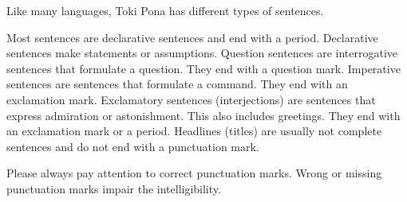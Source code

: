 Like many languages, Toki Pona has different types of sentences.

Most sentences are declarative sentences and end with a period.
Declarative sentences make statements or assumptions.
%
Question sentences are interrogative sentences that formulate a question.
They end with a question mark.
%
Imperative sentences are sentences that formulate a command.
They end with an exclamation mark.
%
Exclamatory sentences (interjections) are sentences that express admiration or astonishment.
This also includes greetings.
They end with an exclamation mark or a period.
%
Headlines (titles) are usually not complete sentences and do not end with a punctuation mark.

Please always pay attention to correct punctuation marks.
Wrong or missing punctuation marks impair the intelligibility.


